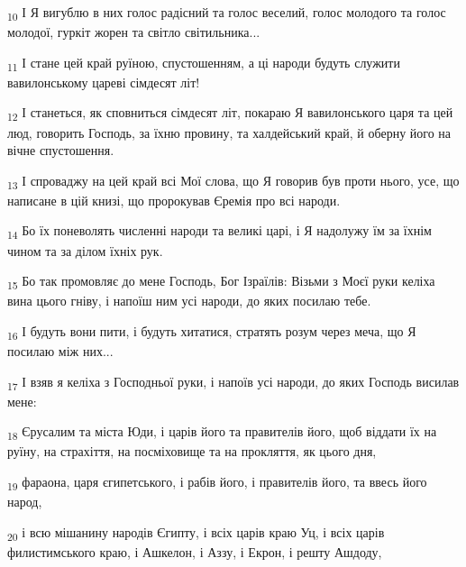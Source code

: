 \begin{tcolorbox}
\textsubscript{10} І Я вигублю в них голос радісний та голос веселий, голос молодого та голос молодої, гуркіт жорен та світло світильника...
\end{tcolorbox}
\begin{tcolorbox}
\textsubscript{11} І стане цей край руїною, спустошенням, а ці народи будуть служити вавилонському цареві сімдесят літ!
\end{tcolorbox}
\begin{tcolorbox}
\textsubscript{12} І станеться, як сповниться сімдесят літ, покараю Я вавилонського царя та цей люд, говорить Господь, за їхню провину, та халдейський край, й оберну його на вічне спустошення.
\end{tcolorbox}
\begin{tcolorbox}
\textsubscript{13} І спроваджу на цей край всі Мої слова, що Я говорив був проти нього, усе, що написане в цій книзі, що пророкував Єремія про всі народи.
\end{tcolorbox}
\begin{tcolorbox}
\textsubscript{14} Бо їх поневолять численні народи та великі царі, і Я надолужу їм за їхнім чином та за ділом їхніх рук.
\end{tcolorbox}
\begin{tcolorbox}
\textsubscript{15} Бо так промовляє до мене Господь, Бог Ізраїлів: Візьми з Моєї руки келіха вина цього гніву, і напоїш ним усі народи, до яких посилаю тебе.
\end{tcolorbox}
\begin{tcolorbox}
\textsubscript{16} І будуть вони пити, і будуть хитатися, стратять розум через меча, що Я посилаю між них...
\end{tcolorbox}
\begin{tcolorbox}
\textsubscript{17} І взяв я келіха з Господньої руки, і напоїв усі народи, до яких Господь висилав мене:
\end{tcolorbox}
\begin{tcolorbox}
\textsubscript{18} Єрусалим та міста Юди, і царів його та правителів його, щоб віддати їх на руїну, на страхіття, на посміховище та на прокляття, як цього дня,
\end{tcolorbox}
\begin{tcolorbox}
\textsubscript{19} фараона, царя єгипетського, і рабів його, і правителів його, та ввесь його народ,
\end{tcolorbox}
\begin{tcolorbox}
\textsubscript{20} і всю мішанину народів Єгипту, і всіх царів краю Уц, і всіх царів филистимського краю, і Ашкелон, і Аззу, і Екрон, і решту Ашдоду,
\end{tcolorbox}
